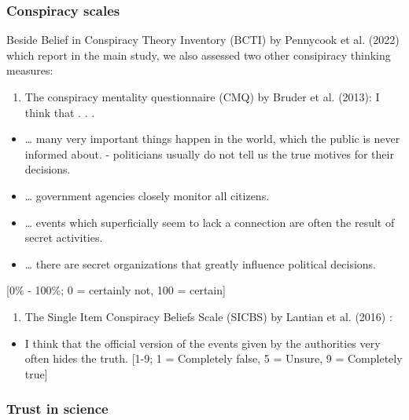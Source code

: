 \documentclass[
  doc,floatsintext]{apa6}
\providecommand{\tightlist}{%
  \setlength{\itemsep}{0pt}\setlength{\parskip}{0pt}}
\begin{document}
\FloatBarrier

\hypertarget{conspiracy-scales-1}{%
\subsubsection{Conspiracy scales}\label{conspiracy-scales-1}}

Beside Belief in Conspiracy Theory Inventory (BCTI) by Pennycook et al. (2022) which report in the main study, we also assessed two other consipiracy thinking measures:

\begin{enumerate}
\def\labelenumi{\arabic{enumi}.}
\tightlist
\item
  The conspiracy mentality questionnaire (CMQ) by Bruder et al. (2013):
  I think that . . .
\end{enumerate}

\begin{itemize}
\tightlist
\item
  \ldots{} many very important things happen in the world, which the public is never informed about. - politicians usually do not tell us the true motives for their decisions.
\item
  \ldots{} government agencies closely monitor all citizens.
\item
  \ldots{} events which superficially seem to lack a connection are often the result of secret activities.
\item
  \ldots{} there are secret organizations that greatly influence political decisions.
\end{itemize}

{[}0\% - 100\%; 0 = certainly not, 100 = certain{]}

\begin{enumerate}
\def\labelenumi{\arabic{enumi}.}
\setcounter{enumi}{1}
\tightlist
\item
  The Single Item Conspiracy Beliefs Scale (SICBS) by Lantian et al. (2016) :
\end{enumerate}

\begin{itemize}
\tightlist
\item
  I think that the official version of the events given by the authorities very often hides the truth. {[}1-9; 1 = Completely false, 5 = Unsure, 9 = Completely true{]}
\end{itemize}

\hypertarget{trust-in-science-1}{%
\subsubsection{Trust in science}\label{trust-in-science-1}}
\end{document}
